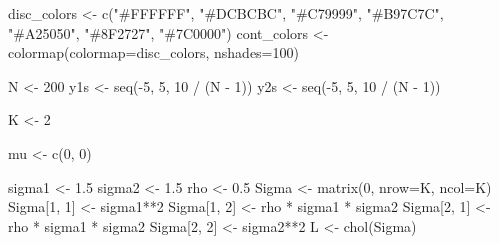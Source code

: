 \documentclass[
  letterpaper,
  DIV=11,
  numbers=noendperiod]{scrartcl}
\newenvironment{Shaded}{\begin{snugshade}}{\end{snugshade}}
\newcommand{\AttributeTok}[1]{\textcolor[rgb]{0.40,0.45,0.13}{#1}}
\newcommand{\DecValTok}[1]{\textcolor[rgb]{0.68,0.00,0.00}{#1}}
\newcommand{\FloatTok}[1]{\textcolor[rgb]{0.68,0.00,0.00}{#1}}
\newcommand{\FunctionTok}[1]{\textcolor[rgb]{0.28,0.35,0.67}{#1}}
\newcommand{\NormalTok}[1]{\textcolor[rgb]{0.00,0.23,0.31}{#1}}
\newcommand{\OtherTok}[1]{\textcolor[rgb]{0.00,0.23,0.31}{#1}}
\newcommand{\SpecialCharTok}[1]{\textcolor[rgb]{0.37,0.37,0.37}{#1}}
\newcommand{\StringTok}[1]{\textcolor[rgb]{0.13,0.47,0.30}{#1}}
\begin{document}
\begin{Shaded}
\begin{Highlighting}[]
\NormalTok{disc\_colors }\OtherTok{\textless{}{-}} \FunctionTok{c}\NormalTok{(}\StringTok{"\#FFFFFF"}\NormalTok{, }\StringTok{"\#DCBCBC"}\NormalTok{, }\StringTok{"\#C79999"}\NormalTok{, }\StringTok{"\#B97C7C"}\NormalTok{,}
                 \StringTok{"\#A25050"}\NormalTok{, }\StringTok{"\#8F2727"}\NormalTok{, }\StringTok{"\#7C0000"}\NormalTok{)}
\NormalTok{cont\_colors }\OtherTok{\textless{}{-}} \FunctionTok{colormap}\NormalTok{(}\AttributeTok{colormap=}\NormalTok{disc\_colors, }\AttributeTok{nshades=}\DecValTok{100}\NormalTok{)}

\NormalTok{N }\OtherTok{\textless{}{-}} \DecValTok{200}
\NormalTok{y1s }\OtherTok{\textless{}{-}} \FunctionTok{seq}\NormalTok{(}\SpecialCharTok{{-}}\DecValTok{5}\NormalTok{, }\DecValTok{5}\NormalTok{, }\DecValTok{10} \SpecialCharTok{/}\NormalTok{ (N }\SpecialCharTok{{-}} \DecValTok{1}\NormalTok{))}
\NormalTok{y2s }\OtherTok{\textless{}{-}} \FunctionTok{seq}\NormalTok{(}\SpecialCharTok{{-}}\DecValTok{5}\NormalTok{, }\DecValTok{5}\NormalTok{, }\DecValTok{10} \SpecialCharTok{/}\NormalTok{ (N }\SpecialCharTok{{-}} \DecValTok{1}\NormalTok{))}


\NormalTok{K }\OtherTok{\textless{}{-}} \DecValTok{2}

\NormalTok{mu }\OtherTok{\textless{}{-}} \FunctionTok{c}\NormalTok{(}\DecValTok{0}\NormalTok{, }\DecValTok{0}\NormalTok{)}

\NormalTok{sigma1 }\OtherTok{\textless{}{-}} \FloatTok{1.5}
\NormalTok{sigma2 }\OtherTok{\textless{}{-}} \FloatTok{1.5}
\NormalTok{rho }\OtherTok{\textless{}{-}} \FloatTok{0.5}
\NormalTok{Sigma }\OtherTok{\textless{}{-}} \FunctionTok{matrix}\NormalTok{(}\DecValTok{0}\NormalTok{, }\AttributeTok{nrow=}\NormalTok{K, }\AttributeTok{ncol=}\NormalTok{K)}
\NormalTok{Sigma[}\DecValTok{1}\NormalTok{, }\DecValTok{1}\NormalTok{] }\OtherTok{\textless{}{-}}\NormalTok{ sigma1}\SpecialCharTok{**}\DecValTok{2}
\NormalTok{Sigma[}\DecValTok{1}\NormalTok{, }\DecValTok{2}\NormalTok{] }\OtherTok{\textless{}{-}}\NormalTok{ rho }\SpecialCharTok{*}\NormalTok{ sigma1 }\SpecialCharTok{*}\NormalTok{ sigma2}
\NormalTok{Sigma[}\DecValTok{2}\NormalTok{, }\DecValTok{1}\NormalTok{] }\OtherTok{\textless{}{-}}\NormalTok{ rho }\SpecialCharTok{*}\NormalTok{ sigma1 }\SpecialCharTok{*}\NormalTok{ sigma2}
\NormalTok{Sigma[}\DecValTok{2}\NormalTok{, }\DecValTok{2}\NormalTok{] }\OtherTok{\textless{}{-}}\NormalTok{ sigma2}\SpecialCharTok{**}\DecValTok{2}
\NormalTok{L }\OtherTok{\textless{}{-}} \FunctionTok{chol}\NormalTok{(Sigma)}


\end{Highlighting}
\end{Shaded}
\end{document}
